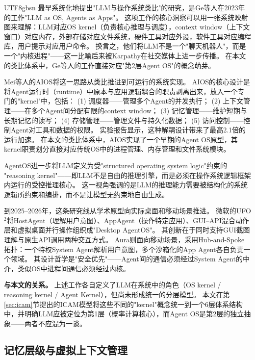 \documentclass[11pt,a4paper]{article}
\begin{document}
\begin{CJK*}{UTF8}{gbsn}
最早系统化地提出"LLM与操作系统类比"的研究，是Ge等人在2023年的工作"LLM as OS, Agents as Apps"\cite{ge2023llmos}。
这项工作的核心洞察可以用一张系统映射图来理解：LLM对应OS kernel（负责核心推理与调度），context window（上下文窗口）对应内存，外部存储对应文件系统，硬件工具对应外设，软件工具对应编程库，用户提示对应用户命令。
换言之，他们将LLM不是一个"聊天机器人"，而是一个"内核进程"——这一比喻后来被Karpathy在社交媒体上进一步传播\cite{karpathy2023llmos}。
在本文的类比体系中，Ge等人的工作直接对应"第2层Agent OS"的概念萌芽。

Mei等人的AIOS\cite{mei2024aios}将这一思路从类比推进到可运行的系统实现。
AIOS的核心设计是将Agent运行时（runtime）中原本与应用逻辑耦合的职责剥离出来，放入一个专门的"kernel"中，包括：
(1) 调度器——管理多个Agent的并发执行；
(2) 上下文管理——在多个Agent间分配有限的context window；
(3) 记忆管理——维护短期与长期记忆的读写；
(4) 存储管理——管理文件与持久化数据；
(5) 访问控制——控制Agent对工具和数据的权限。
实验报告显示，这种解耦设计带来了最高2.1倍的运行加速。
在本文的类比体系中，AIOS实现了一个早期的Agent OS原型，其kernel职责划分直接对应传统OS中的进程管理、内存管理和文件系统模块。

AgentOS\cite{agentos2025}进一步将LLM定义为受"structured operating system logic"约束的%
"reasoning kernel"——即LLM不是自由的推理引擎，而是必须在操作系统逻辑框架内运行的受控推理核心。
这一视角强调的是LLM的推理能力需要被结构化的系统逻辑所约束和编排，而不是让模型无约束地自由生成。

到2025--2026年，这条研究线从学术原型向实际桌面和移动场景推进。
微软的UFO$^2$\cite{ufo2_2025}将HostAgent（理解用户意图）、AppAgent（操作特定应用）、GUI--API混合动作层和虚拟桌面并行操作组织成"Desktop AgentOS"。
其创新在于同时支持GUI截图理解与原生API调用两种交互方式。
Aura\cite{aura2025}则面向移动场景，采用Hub-and-Spoke拓扑：一个特权System Agent解析用户意图，多个沙箱化的App Agent各自负责一个领域。
其设计哲学是"安全优先"——Agent间的通信必须经过System Agent的中介，类似OS中进程间通信必须经过内核。

\textbf{与本文的关系。}
上述工作各自定义了LLM在系统中的角色（OS kernel / reasoning kernel / Agent Kernel），但尚未形成统一的分层模型。
本文在第\ref{sec:icam}节提出的ICAM模型将这些不同的"kernel"概念统一到一个6层体系结构中，并明确LLM应被定位为第1层（概率计算核心），而Agent OS是第2层的独立抽象——两者不应混为一谈。

\subsection{记忆层级与虚拟上下文管理}
\label{sec:related-memory}


\end{CJK*}
\end{document}
